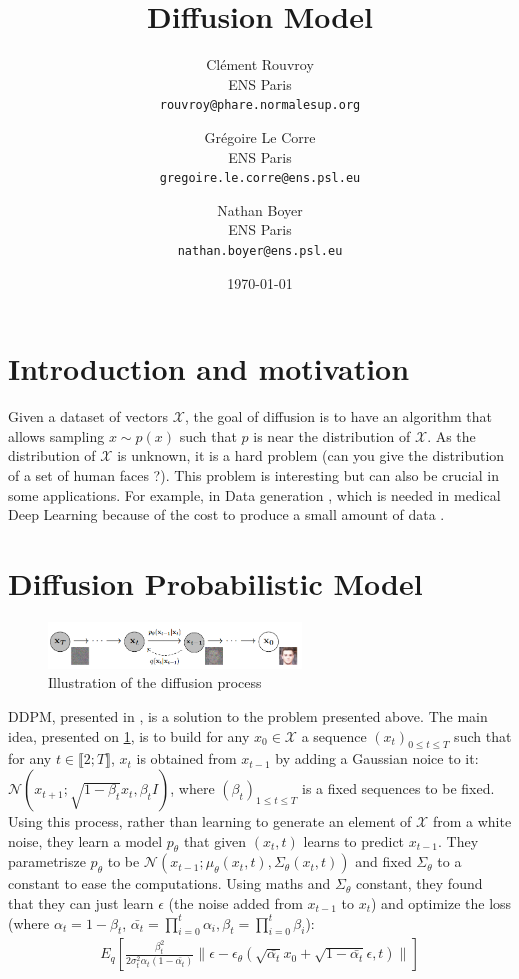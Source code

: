 \documentclass[a4paper,11pt]{article}
\title{Diffusion Model}
\author{Clément Rouvroy\\
        \small{ENS Paris}\\
        \small{\texttt{rouvroy@phare.normalesup.org}} \and
        Grégoire Le Corre\\
        \small{ENS Paris}\\
        \small{\texttt{gregoire.le.corre@ens.psl.eu}} \and
        Nathan Boyer\\
        \small{ENS Paris}\\
        \small{\texttt{nathan.boyer@ens.psl.eu}}}
\date{\today}
\begin{document}
\maketitle

\section{Introduction and motivation}

Given a dataset of vectors $\mathcal{X}$, the goal of diffusion is to have an algorithm that allows sampling $x \sim p(x)$ such that $p$  is near the distribution of $\mathcal{X}$. As the distribution of $\mathcal{X}$ is unknown, it is a hard problem (can you give the distribution of a set of human faces ?). This problem is interesting but can also be crucial in some applications. For example, in Data generation \cite{trabucco2023effectivedataaugmentationdiffusion}, which is needed in medical Deep Learning because of the cost to produce a small amount of data \cite{tormos2024dataaugmentationdiffusionmodels}.


\section{Diffusion Probabilistic Model}

\begin{figure}[h]
    \centering
    \includegraphics[width=0.6\textwidth]{imgs/ho_diffusion_process.png}
    \caption{Illustration of the diffusion process}
    \label{img:diff}
\end{figure}
DDPM, presented in \cite{hoDenoisingDiffusionProbabilistic2020}, is a solution to the problem presented above.  The main idea, presented on \cref{img:diff}, is to build  for any $x_0 \in \mathcal{X}$ a sequence $(x_t)_{0 \leq t \leq T}$ such that for any $t \in \llbracket 2; T\rrbracket$, $x_{t}$ is obtained from $x_{t-1}$ by adding a Gaussian noice to it: $\mathcal{N}(x_{t+1}; \sqrt{1 - \beta_t} x_t, \beta_t I)$, where $(\beta_t)_{1 \leq t \leq T}$ is a fixed sequences to be fixed. Using this process, rather than learning to generate an element of $\mathcal{X}$ from a white noise, they learn a model $p_\theta$ that given $(x_t,t)$ learns to predict $x_{t-1}$. They parametrisze $p_\theta$ to be $\mathcal{N}(x_{t-1}; \mu_\theta(x_t,t),\Sigma_\theta(x_t,t))$ and fixed $\Sigma_\theta$ to a constant to ease the computations.  Using maths and $\Sigma_\theta$ constant, they found that they can just learn $\epsilon$ (the noise added from $x_{t-1}$ to $x_t$) and optimize the loss (where $\alpha_t = 1 - \beta_t$, $\bar{\alpha_t} = \prod_{i=0}^t \alpha_i, {\beta_t} = \prod_{i=0}^t \beta_i$):
\begin{align}
    E_q \left[ \frac{\beta_t^2}{2 \sigma_t^2 \alpha_t (1 - \bar{\alpha_t})} \|\epsilon - \epsilon_\theta (\sqrt{\bar{\alpha_t}} x_0 + \sqrt{1 - \bar{\alpha_t}} \epsilon, t)\|\right] \label{eq:loss1}
\end{align}
\end{document}
